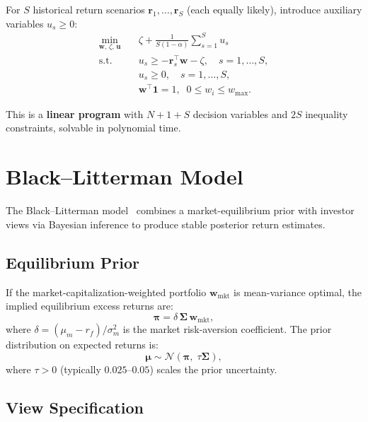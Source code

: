 \documentclass[12pt,a4paper]{article}
\begin{document}
For $S$ historical return scenarios $\bm{r}_1, \ldots, \bm{r}_S$ (each equally likely), introduce auxiliary variables $u_s \geq 0$:
\begin{equation}
\boxed{
\begin{aligned}
    \min_{\bm{w},\,\zeta,\,\bm{u}} \quad
        & \zeta + \frac{1}{S(1-\alpha)} \sum_{s=1}^{S} u_s \\
    \text{s.t.} \quad
        & u_s \geq -\bm{r}_s^\top\bm{w} - \zeta, \quad s = 1, \ldots, S, \\
        & u_s \geq 0, \quad s = 1, \ldots, S, \\
        & \bm{w}^\top\bm{1} = 1,\;\; 0 \leq w_i \leq w_{\max}.
\end{aligned}
}
\label{eq:cvar-lp}
\end{equation}

This is a \textbf{linear program} with $N + 1 + S$ decision variables and $2S$ inequality constraints, solvable in polynomial time.

\section{Black--Litterman Model}
\label{sec:bl}

The Black--Litterman model~\cite{black1992} combines a market-equilibrium prior with investor views via Bayesian inference to produce stable posterior return estimates.

\subsection{Equilibrium Prior}

If the market-capitalization-weighted portfolio $\bm{w}_{\text{mkt}}$ is mean-variance optimal, the implied equilibrium excess returns are:
\begin{equation}
    \bm{\pi} = \delta\,\bm{\Sigma}\,\bm{w}_{\text{mkt}},
    \label{eq:bl-pi}
\end{equation}
where $\delta = (\mu_m - r_f)/\sigma_m^2$ is the market risk-aversion coefficient. The prior distribution on expected returns is:
\begin{equation}
    \bm{\mu} \sim \mathcal{N}(\bm{\pi},\; \tau\bm{\Sigma}),
    \label{eq:bl-prior}
\end{equation}
where $\tau > 0$ (typically $0.025$--$0.05$) scales the prior uncertainty.

\subsection{View Specification}
\end{document}
